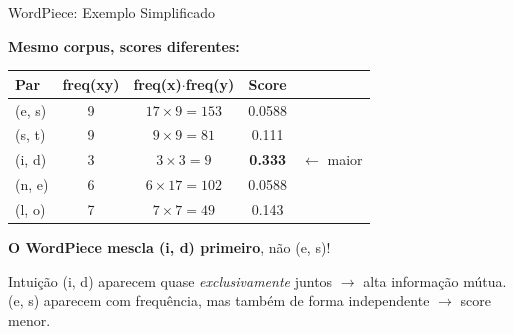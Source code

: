 \documentclass[aspectratio=169,xcolor=dvipsnames]{beamer}
\begin{document}
\begin{frame}{WordPiece: Exemplo Simplificado}

\textbf{Mesmo corpus, scores diferentes:}

\vspace{4pt}

\begin{center}
\small
\renewcommand{\arraystretch}{1.2}
\begin{tabular}{lcccl}
\toprule
\textbf{Par} & \textbf{freq(xy)} & \textbf{freq(x)$\cdot$freq(y)} & \textbf{Score} & \\
\midrule
(e, s) & 9 & $17 \times 9 = 153$  & 0.0588 & \\
(s, t) & 9 & $9 \times 9 = 81$   & 0.111  & \\
(i, d) & 3 & $3 \times 3 = 9$    & \textbf{0.333} & $\leftarrow$ maior \\
(n, e) & 6 & $6 \times 17 = 102$ & 0.0588 & \\
(l, o) & 7 & $7 \times 7 = 49$   & 0.143  & \\
\bottomrule
\end{tabular}
\end{center}

\vspace{4pt}

\textbf{O WordPiece mescla (i, d) primeiro}, não (e, s)!

\vspace{2pt}

\begin{alertblock}{Intuição}
(i, d) aparecem quase \textit{exclusivamente} juntos $\rightarrow$ alta informação mútua. \\
(e, s) aparecem com frequência, mas também de forma independente $\rightarrow$ score menor.
\end{alertblock}

\end{frame}

\end{document}

